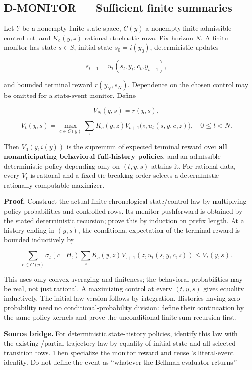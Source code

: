 \documentclass[
  11pt,
  a4paper,
]{article}
\newcommand{\codewrap}[1]{{\ttfamily\seqsplit{#1}}}
\begin{document}
\subsection{D-MONITOR --- Sufficient finite
summaries}\label{d-monitor-sufficient-finite-summaries}

Let \(Y\) be a nonempty finite state space, \(C(y)\) a nonempty finite
admissible control set, and \(K_c(y,z)\) rational stochastic rows. Fix
horizon \(N\). A finite monitor has state \(s\in S\), initial state
\(s_0=i(y_0)\), deterministic updates

\[s_{t+1}=u_t(s_t,y_t,c_t,y_{t+1}),\]

and bounded terminal reward \(r(y_N,s_N)\). Dependence on the chosen
control may be omitted for a state-event monitor. Define

\[V_N(y,s)=r(y,s),\]

\[V_t(y,s)=\max_{c\in C(y)}\sum_zK_c(y,z)
 V_{t+1}\bigl(z,u_t(s,y,c,z)\bigr),\quad 0\le t<N.\]

Then \(V_0(y,i(y))\) is the supremum of expected terminal reward over
\textbf{all nonanticipating behavioral full-history policies}, and an
admissible deterministic policy depending only on \((t,y,s)\) attains
it. For rational data, every \(V_t\) is rational and a fixed
tie-breaking order selects a deterministic rationally computable
maximizer.

\textbf{Proof.} Construct the actual finite chronological state/control
law by multiplying policy probabilities and controlled rows. Its monitor
pushforward is obtained by the stated deterministic recursion; prove
this by induction on prefix length. At a history ending in \((y,s)\),
the conditional expectation of the terminal reward is bounded
inductively by

\[\sum_{c\in C(y)}\sigma_t(c\mid H_t)
 \sum_zK_c(y,z)V_{t+1}(z,u_t(s,y,c,z))\le V_t(y,s).\]

This uses only convex averaging and finiteness; the behavioral
probabilities may be real, not just rational. A maximizing control at
every \((t,y,s)\) gives equality inductively. The initial law version
follows by integration. Histories having zero probability need no
conditional-probability division: define their continuation by the same
policy kernels and prove the unconditional finite-sum recursion first.

\textbf{Source bridge.} For deterministic state-history policies,
identify this law with the existing
\codewrap{HistoryPolicy}/partial-trajectory law by equality of initial
state and all selected transition rows. Then specialize the monitor
reward and reuse \codewrap{ResidenceValue}'s literal-event identity. Do
not define the event as ``whatever the Bellman evaluator returns.''
\end{document}
